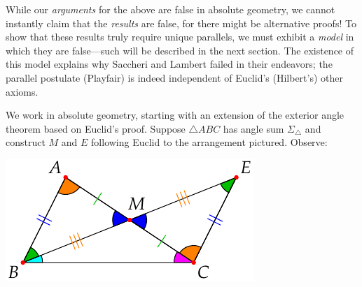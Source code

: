 While our \emph{arguments} for the above are false in absolute geometry, we cannot instantly claim that the \emph{results} are false, for there might be alternative proofs! To show that these results truly require unique parallels, we must exhibit a \emph{model} in which they are false---such will be described in the next section. The existence of this model explains why Saccheri and Lambert failed in their endeavors; the parallel postulate (Playfair) is indeed independent of Euclid's (Hilbert's) other axioms.

\goodbreak



\begin{minipage}[t]{0.62\linewidth}\vspace{0pt}
	
	We work in absolute geometry, starting with an extension of the exterior angle theorem based on Euclid's proof.\smallbreak
	Suppose $\triangle ABC$ has angle sum $\Sigma_\triangle$ and construct $M$ and $E$ following Euclid to the arrangement pictured. Observe:
\end{minipage}
\hfill
\begin{minipage}[t]{0.36\linewidth}\vspace{0pt}
	\flushright\includegraphics[scale=0.95]{history-saccheri}
\end{minipage}

